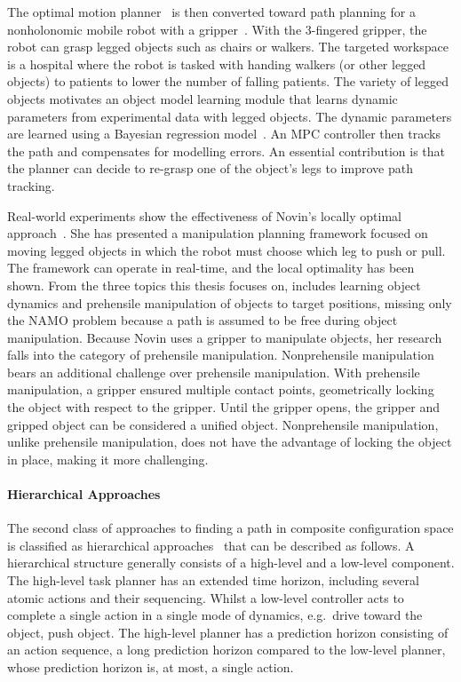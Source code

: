 The optimal motion planner~\cite{sabbaghnovin_optimal_2016} is then converted toward path planning for a nonholonomic mobile robot with a gripper~\cite{novin_dynamic_2018}. With the 3-fingered gripper, the robot can grasp legged objects such as chairs or walkers. The targeted workspace is a hospital where the robot is tasked with handing walkers (or other legged objects) to patients to lower the number of falling patients. The variety of legged objects motivates an object model learning module that learns dynamic parameters from experimental data with legged objects. The dynamic parameters are learned using a Bayesian regression model~\cite{scholz_navigation_2016}. An \ac{MPC} controller then tracks the path and compensates for modelling errors. An essential contribution is that the planner can decide to re-grasp one of the object's legs to improve path tracking.\bs

Real-world experiments show the effectiveness of Novin's locally optimal approach~\cite{sabbaghnovin_model_2021}. She has presented a manipulation planning framework focused on moving legged objects in which the robot must choose which leg to push or pull. The framework can operate in real-time, and the local optimality has been shown. From the three topics this thesis focuses on, \citeauthor{sabbaghnovin_model_2021} includes learning object dynamics and prehensile manipulation of objects to target positions, missing only the \ac{NAMO} problem because a path is assumed to be free during object manipulation. Because Novin uses a gripper to manipulate objects, her research falls into the category of prehensile manipulation. Nonprehensile manipulation bears an additional challenge over prehensile manipulation. With prehensile manipulation, a gripper ensured multiple contact points, geometrically locking the object with respect to the gripper. Until the gripper opens, the gripper and gripped object can be considered a unified object. Nonprehensile manipulation, unlike prehensile manipulation, does not have the advantage of locking the object in place, making it more challenging.\bs

\paragraph{Hierarchical Approaches}
The second class of approaches to finding a path in composite configuration space is classified as hierarchical approaches~\cite{ellis_navigation_2022,krontiris_dealing_2015,scholz_navigation_2016,vega-brown_asymptotically_2020,wang_affordancebased_2020} that can be described as follows. A hierarchical structure generally consists of a high-level and a low-level component. The high-level task planner has an extended time horizon, including several atomic actions and their sequencing. Whilst a low-level controller acts to complete a single action in a single mode of dynamics, e.g.~drive toward the object, push object. The high-level planner has a prediction horizon consisting of an action sequence, a long prediction horizon compared to the low-level planner, whose prediction horizon is, at most, a single action.\bs

